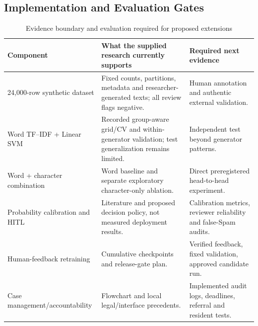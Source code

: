 \subsection{Implementation and Evaluation Gates}
\begin{table}[H]\centering\small\caption{Evidence boundary and evaluation required for proposed extensions}\label{tab:op-evidence}\begin{tabularx}{\textwidth}{p{}Xp{}}\toprule
Component & What the supplied research currently supports & Required next evidence\\\midrule
24,000-row synthetic dataset & Fixed counts, partitions, metadata and researcher-generated texts; all review flags negative. & Human annotation and authentic external validation.\\
Word TF--IDF + Linear SVM & Recorded group-aware grid/CV and within-generator validation; test generalization remains limited. & Independent test beyond generator patterns.\\
Word + character combination & Word baseline and separate exploratory character-only ablation. & Direct preregistered head-to-head experiment.\\
Probability calibration and HITL & Literature and proposed decision policy, not measured deployment results. & Calibration metrics, reviewer reliability and false-Spam audits.\\
Human-feedback retraining & Cumulative checkpoints and release-gate plan. & Verified feedback, fixed validation, approved candidate run.\\
Case management/accountability & Flowchart and local legal/interface precedents. & Implemented audit logs, deadlines, referral and resident tests.\\\bottomrule
\end{tabularx}\end{table}
